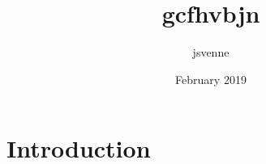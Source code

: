 \documentclass{article}
\title{gcfhvbjn}
\author{jsvenne }
\date{February 2019}
\begin{document}
\maketitle

\section{Introduction}
\end{document}
